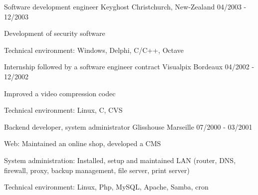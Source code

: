 \begin{cventries}
  \cventry
    {Software development engineer}
    {Keyghost}
    {Christchurch, New-Zealand}
    {04/2003 - 12/2003}
    {
      \begin{cvitems}
        \item {Development of security software}
		\item {Technical environment: Windows, Delphi, C/C++, Octave}
      \end{cvitems}
    }

  \cventry
    {Internship followed by a software engineer contract}
    {Visualpix}
    {Bordeaux}
    {04/2002 - 12/2002}
    {
      \begin{cvitems}
        \item {Improved a video compression codec}
		\item {Technical environment: Linux, C, CVS}
      \end{cvitems}
    }

  \cventry
    {Backend developer, system administrator}
    {Glisshouse}
    {Marseille}
    {07/2000 - 03/2001}
    {
      \begin{cvitems}
        \item {Web: Maintained an online shop, developed a CMS}
        \item {System administration: Installed, setup and maintained LAN
            (router, DNS, firewall, proxy, backup management, file server,
            print server)}
		\item {Technical environment: Linux, Php, MySQL, Apache, Samba, cron}
      \end{cvitems}
    }

\end{cventries}
